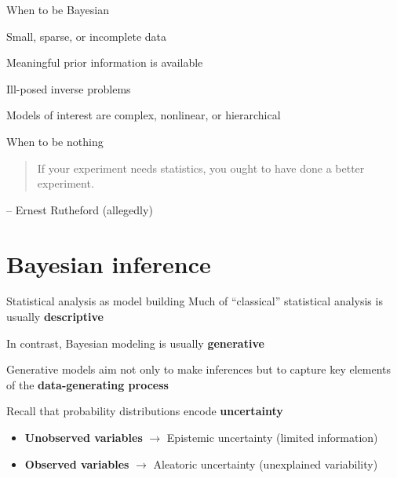 \documentclass[12pt,aspectratio=169]{beamer}
\begin{document}
\begin{frame}{When to be Bayesian}

Small, sparse, or incomplete data
\pause\newline

Meaningful prior information is available
\pause\newline

Ill-posed inverse problems
\pause\newline

Models of interest are complex, nonlinear, or hierarchical

\end{frame}

\begin{frame}{When to be nothing}
    \centering
    \begin{quote}
    If your experiment needs statistics, you ought to have done a better experiment.
    \end{quote}
    -- Ernest Rutheford (allegedly)
\end{frame}

\section{Bayesian inference}

\begin{frame}{Statistical analysis as model building}
    Much of ``classical'' statistical analysis is usually \textbf{descriptive}
    \newline\pause

    In contrast, Bayesian modeling is usually \textbf{generative}
    \newline\pause

    Generative models aim not only to make inferences but to capture key elements of the \textbf{data-generating process}
    \newline\pause

    Recall that probability distributions encode \textbf{uncertainty}
    \begin{itemize}
        \item \textbf{Unobserved variables} $\rightarrow$ Epistemic uncertainty (limited information)
        \item \textbf{Observed variables} $\rightarrow$ Aleatoric uncertainty (unexplained variability)
    \end{itemize}
\end{frame}
\end{document}
